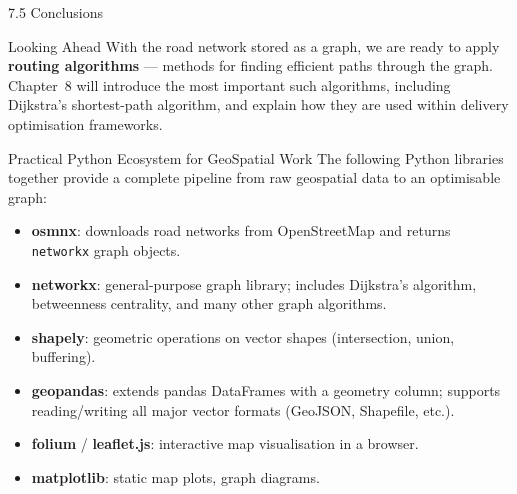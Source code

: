 \documentclass[aspectratio=169,10pt]{beamer}
\begin{document}
\begin{frame}[allowframebreaks]{7.5 Conclusions}
  \framebreak

  \begin{alertblock}{Looking Ahead}
    With the road network stored as a graph, we are ready to apply
    \textbf{routing algorithms} --- methods for finding efficient
    paths through the graph.  Chapter~8 will introduce the most
    important such algorithms, including Dijkstra's shortest-path
    algorithm, and explain how they are used within delivery
    optimisation frameworks.
  \end{alertblock}

  \begin{block}{Practical Python Ecosystem for GeoSpatial Work}
    The following Python libraries together provide a complete pipeline
    from raw geospatial data to an optimisable graph:
    \begin{itemize}
      \item \textbf{osmnx}: downloads road networks from OpenStreetMap
            and returns \texttt{networkx} graph objects.
      \item \textbf{networkx}: general-purpose graph library;
            includes Dijkstra's algorithm, betweenness centrality,
            and many other graph algorithms.
      \item \textbf{shapely}: geometric operations on vector shapes
            (intersection, union, buffering).
      \item \textbf{geopandas}: extends pandas DataFrames with a
            geometry column; supports reading/writing all major
            vector formats (GeoJSON, Shapefile, etc.).
      \item \textbf{folium} / \textbf{leaflet.js}: interactive map
            visualisation in a browser.
      \item \textbf{matplotlib}: static map plots, graph diagrams.
    \end{itemize}
  \end{block}

\end{frame}
\end{document}
